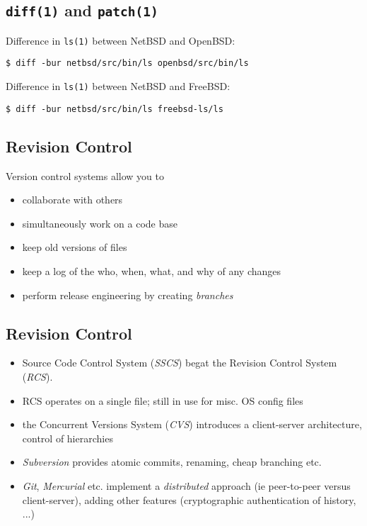 \documentclass[xga]{xdvislides}
\begin{document}
\subsection{{\tt diff(1)} and {\tt patch(1)}}
Difference in {\tt ls(1)} between NetBSD and OpenBSD:
\begin{verbatim}
$ diff -bur netbsd/src/bin/ls openbsd/src/bin/ls
\end{verbatim}

\addvspace{.5in}
Difference in {\tt ls(1)} between NetBSD and FreeBSD:
\begin{verbatim}
$ diff -bur netbsd/src/bin/ls freebsd-ls/ls
\end{verbatim}

\subsection{Revision Control}
Version control systems allow you to

\begin{itemize}
	\item collaborate with others
	\item simultaneously work on a code base
	\item keep old versions of files
	\item keep a log of the who, when, what, and why of any changes
	\item perform release engineering by creating {\em branches}
\end{itemize}

\subsection{Revision Control}
\begin{itemize}
	\item Source Code Control System ({\em SSCS}) begat the Revision
		Control System ({\em RCS}).
	\item RCS operates on a single file; still in use for misc. OS
		config files
	\item the Concurrent Versions System ({\em CVS}) introduces a
		client-server architecture, control of hierarchies
	\item {\em Subversion} provides atomic commits, renaming, cheap
		branching etc.
	\item {\em Git}, {\em Mercurial} etc. implement a {\em
		distributed} approach (ie peer-to-peer versus
		client-server), adding other features (cryptographic
		authentication of history, ...)
\end{itemize}
\end{document}
